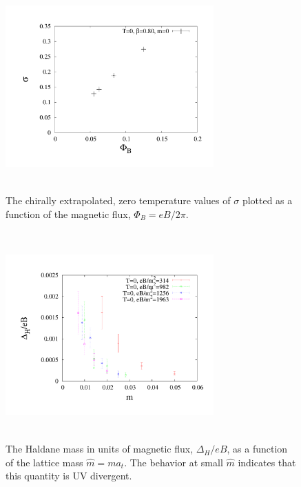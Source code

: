 \documentclass[aps,prd,twocolumn,showpacs,superscriptaddress,groupedaddress]{revtex4}  %
\begin{document}
\begin{figure}
 \includegraphics[height=8cm,width=8cm]{pbp_vs_PHI_NL_graphene_paper.pdf} \hspace{-1cm}
\caption{The chirally extrapolated, zero temperature values of $\sigma$ plotted as a function of the magnetic flux,  $\Phi_B = eB/2\pi$.} 
\label{PBPzeroTChiralvseB}
\end{figure}

\begin{figure}
 \includegraphics[height=8cm,width=8cm]{haldanediveB_vs_m_zeroT_graphene_paper.pdf} \hspace{-1cm}
\caption{The Haldane mass in units of magnetic flux, $\Delta_H/eB$, as a function of the lattice mass $\hat{m} = m a_t$. The behavior at small $\hat{m}$ indicates that
this quantity is UV divergent.}
\label{HaldanediveBvsm} 
\end{figure}
\end{document}

